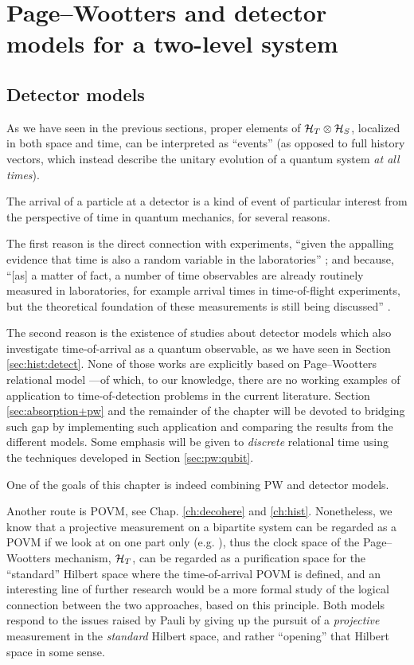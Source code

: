 \section{Page--Wootters and detector models for a two-level system}

\subsection{Detector models}

As we have seen in the previous sections,
proper elements of $\mathcal{H}_T \otimes \mathcal{H}_S$,
localized in both space and time,
can be interpreted as ``events''
(as opposed to full history vectors, which instead describe the unitary evolution
of a quantum system \emph{at all times}).

The arrival of a particle at a detector
is a kind of event
of particular interest from the perspective of time
in quantum mechanics, for several reasons.

The first reason
is the direct connection with experiments,
``given the appalling evidence that time is also a random variable in the laboratories''
\parencite[Ch. 4]{TQM2};
and because,
``{[as]} a matter of fact, a number of time observables are already routinely measured in laboratories,
for example arrival times in time-of-flight experiments,
but the theoretical foundation of these measurements is still being discussed''
\parencite[Preface to the First Ed.]{TQM1}.

The second reason is the existence of studies
about detector models which also investigate
time-of-arrival as a quantum observable,
as we have seen in Section \ref{sec:hist:detect}.
None of those works are explicitly
based on Page--Wootters relational model ---of which, to our knowledge,
there are no working examples of application to
time-of-detection problems in the current literature.
Section \ref{sec:absorption+pw} and the remainder of the chapter
will be devoted to bridging such gap
by implementing such application
and comparing
the results from the different models.
Some emphasis will be given to
\emph{discrete} relational time
using the techniques developed in Section \ref{sec:pw:qubit}.

One of the goals of this chapter
is indeed combining PW and detector models.

Another route is POVM, see Chap. \ref{ch:decohere} and \ref{ch:hist}.
Nonetheless, we know that a projective measurement on a bipartite system
can be regarded as a POVM
if we look at
on one part only (e.g. \cite{Paris2012}),
thus the clock space of the Page--Wootters mechanism, $\mathcal{H}_T$,
can be regarded as a purification space \parencite{Paris2012} for the ``standard''
Hilbert space where the time-of-arrival POVM is defined,
and an interesting line of further research would be a more formal
study of the logical connection between the two approaches, based on this principle.
Both models respond to the issues raised by Pauli
by giving up
the pursuit of
a \emph{projective} measurement in the \emph{standard} Hilbert space,
and rather ``opening'' that Hilbert space in some sense.



